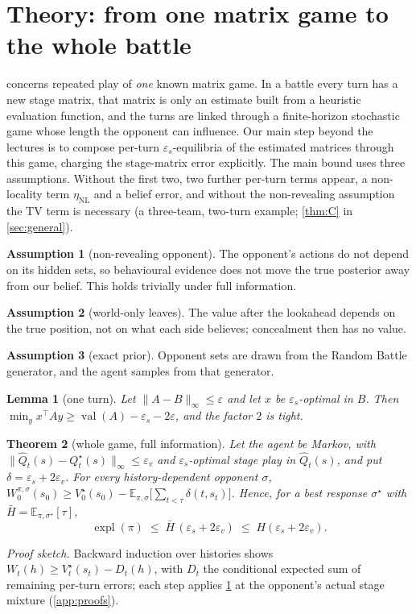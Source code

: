 \documentclass[10pt]{article}
\theoremstyle{plain}
\newtheorem{theorem}{Theorem}
\newtheorem{lemma}[theorem]{Lemma}
\theoremstyle{definition}
\newtheorem{assumption}{Assumption}
\theoremstyle{remark}
\newcommand{\E}{\mathbb{E}}
\newcommand{\Hbar}{\bar H}
\newcommand{\epss}{\varepsilon_s}
\newcommand{\epsv}{\varepsilon_v}
\newcommand{\etaNL}{\eta_{\mathrm{NL}}}
\newcommand{\Qhat}{\hat Q}
\newcommand{\Qstar}{Q^\star}
\newcommand{\Vstar}{V^\star}
\DeclareMathOperator{\val}{val}
\DeclareMathOperator{\expl}{expl}
\begin{document}
\section{Theory: from one matrix game to the whole battle}
\label{sec:theory}
 concerns repeated play of \emph{one} known matrix game. In a battle every turn has a new stage matrix, that matrix is only an estimate built from a heuristic evaluation function, and the turns are linked through a finite-horizon stochastic game whose length the opponent can influence. Our main step beyond the lectures is to compose per-turn $\epss$-equilibria of the estimated matrices through this game, charging the stage-matrix error explicitly. The main bound uses three assumptions. Without the first two, two further per-turn terms appear, a non-locality term $\etaNL$ and a belief error, and without the non-revealing assumption the TV term is necessary (a three-team, two-turn example; \cref{thm:C} in \cref{sec:general}).
\begin{assumption}[non-revealing opponent]\label{asm:nonrev} The opponent's actions do not depend on its hidden sets, so behavioural evidence does not move the true posterior away from our belief. This holds trivially under full information.\end{assumption}
\begin{assumption}[world-only leaves]\label{asm:world} The value after the lookahead depends on the true position, not on what each side believes; concealment then has no value.\end{assumption}
\begin{assumption}[exact prior]\label{asm:prior} Opponent sets are drawn from the Random Battle generator, and the agent samples from that generator.\end{assumption}

\begin{lemma}[one turn]\label{lem:one}
Let $\lVert A-B\rVert_\infty\le\varepsilon$ and let $x$ be $\epss$-optimal in $B$. Then $\min_y x^\top Ay\ge\val(A)-\epss-2\varepsilon$, and the factor $2$ is tight.
\end{lemma}

\begin{theorem}[whole game, full information]\label{thm:full}
Let the agent be Markov, with $\lVert\Qhat_t(s)-\Qstar_t(s)\rVert_\infty\le\epsv$ and $\epss$-optimal stage play in $\Qhat_t(s)$, and put $\delta=\epss+2\epsv$. For every history-dependent opponent $\sigma$, $W^{\pi,\sigma}_0(s_0)\ge\Vstar_0(s_0)-\E_{\pi,\sigma}\big[\sum_{t<\tau}\delta(t,s_t)\big]$. Hence, for a best response $\sigma^\star$ with $\Hbar=\E_{\pi,\sigma^\star}[\tau]$,
\begin{equation}\label{eq:full}
\expl(\pi)\;\le\;\Hbar\,(\epss+2\epsv)\;\le\;H(\epss+2\epsv).
\end{equation}
\end{theorem}
\emph{Proof sketch.} Backward induction over histories shows $W_t(h)\ge\Vstar_t(s_t)-D_t(h)$, with $D_t$ the conditional expected sum of remaining per-turn errors; each step applies \cref{lem:one} at the opponent's actual stage mixture (\cref{app:proofs}).
\end{document}
